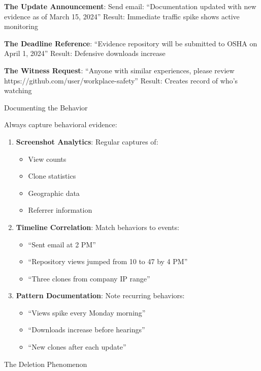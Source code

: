 \textbf{The Update Announcement}: Send email: ``Documentation updated
with new evidence as of March 15, 2024'' Result: Immediate traffic spike
shows active monitoring

\textbf{The Deadline Reference}: ``Evidence repository will be submitted
to OSHA on April 1, 2024'' Result: Defensive downloads increase

\textbf{The Witness Request}: ``Anyone with similar experiences, please
review https://github.com/user/workplace-safety'' Result: Creates record
of who's watching

Documenting the Behavior

Always capture behavioral evidence:

\begin{enumerate}
\def\labelenumi{\arabic{enumi}.}
\tightlist
\item
  \textbf{Screenshot Analytics}: Regular captures of:

  \begin{itemize}
  \tightlist
  \item
    View counts
  \item
    Clone statistics
  \item
    Geographic data
  \item
    Referrer information
  \end{itemize}
\item
  \textbf{Timeline Correlation}: Match behaviors to events:

  \begin{itemize}
  \tightlist
  \item
    ``Sent email at 2 PM''
  \item
    ``Repository views jumped from 10 to 47 by 4 PM''
  \item
    ``Three clones from company IP range''
  \end{itemize}
\item
  \textbf{Pattern Documentation}: Note recurring behaviors:

  \begin{itemize}
  \tightlist
  \item
    ``Views spike every Monday morning''
  \item
    ``Downloads increase before hearings''
  \item
    ``New clones after each update''
  \end{itemize}
\end{enumerate}

The Deletion Phenomenon

